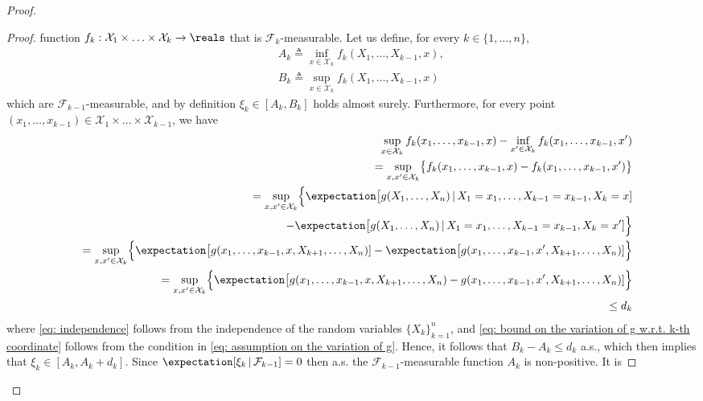 \documentclass{article}
\theoremstyle{plain}
\begin{document}
\begin{proof}
\begin{proof}
function $f_k: \mathcal{X}_1 \times \ldots \times \mathcal{X}_k \rightarrow \reals$
that is $\mathcal{F}_k$-measurable. Let us define, for every $k \in \{1, \ldots, n\}$,
\begin{eqnarray*}
&& A_k \triangleq \inf_{x \in \mathcal{X}_k} f_k(X_1, \ldots, X_{k-1}, x), \\
&& B_k \triangleq \sup_{x \in \mathcal{X}_k} f_k(X_1, \ldots, X_{k-1}, x)
\end{eqnarray*}
which are $\mathcal{F}_{k-1}$-measurable, and by definition
$\xi_k \in [A_k, B_k]$ holds almost surely. Furthermore, for every point
$(x_1, \ldots, x_{k-1}) \in \mathcal{X}_1 \times \ldots \times \mathcal{X}_{k-1}$,
we have
\begin{eqnarray}
&& \sup_{x \in \mathcal{X}_k} f_k(x_1, \ldots, x_{k-1}, x) -
\inf_{x' \in \mathcal{X}_k} f_k(x_1, \ldots, x_{k-1}, x') \nonumber \\
&& = \sup_{x, x' \in \mathcal{X}_k} \bigl\{ f_k(x_1, \ldots, x_{k-1}, x) -
f_k(x_1, \ldots, x_{k-1}, x') \bigr\} \nonumber \\
&& = \sup_{x, x' \in \mathcal{X}_k} \Bigl\{
\expectation \bigl[ g(X_1, \ldots, X_n) \, | \, X_1 = x_1, \ldots, X_{k-1} = x_{k-1}, X_k=x] \nonumber \\
&& \hspace*{1.7cm} - \expectation \bigl[ g(X_1, \ldots, X_n) \, | \, X_1 = x_1, \ldots, X_{k-1} = x_{k-1}, X_k=x'] \Bigr\} \nonumber \\
&& = \sup_{x, x' \in \mathcal{X}_k} \Bigl\{
\expectation \bigl[ g(x_1, \ldots, x_{k-1}, x, X_{k+1}, \ldots, X_n)]
- \expectation \bigl[ g(x_1, \ldots, x_{k-1}, x', X_{k+1}, \ldots, X_n)] \Bigr\}
\label{eq: independence} \\
&& = \sup_{x, x' \in \mathcal{X}_k} \Bigl\{
\expectation \bigl[ g(x_1, \ldots, x_{k-1}, x, X_{k+1}, \ldots, X_n)
- g(x_1, \ldots, x_{k-1}, x', X_{k+1}, \ldots, X_n)] \Bigr\} \nonumber \\
&& \leq d_k \label{eq: bound on the variation of g w.r.t. k-th coordinate}
\end{eqnarray}
where \eqref{eq: independence} follows from the independence of the random variables
$\{X_k\}_{k=1}^n$, and \eqref{eq: bound on the variation of g w.r.t. k-th coordinate}
follows from the condition in \eqref{eq: assumption on the variation of g}. Hence, it
follows that $B_k - A_k \leq d_k$ a.s., which then implies that $\xi_k \in [A_k, A_k+d_k]$.
Since $\expectation[\xi_k \, | \, \mathcal{F}_{k-1}] = 0$ then
a.s. the $\mathcal{F}_{k-1}$-measurable function $A_k$ is non-positive. It is

\end{proof}
\end{proof}
\end{document}
